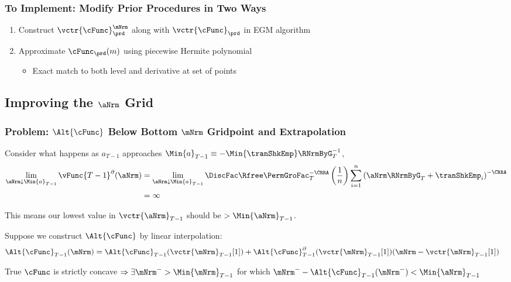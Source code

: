 \documentclass{beamer}
\begin{document}
\begin{frame}
\frametitle{To Implement: Modify Prior Procedures in Two Ways}
\begin{enumerate}
\item Construct $\vctr{\cFunc}^{\mNrm}_{\prd}$ along with $\vctr{\cFunc}_{\prd}$ in EGM algorithm
\item Approximate $\cFunc_{\prd}(m)$ using piecewise Hermite polynomial
\begin{itemize}
\item Exact match to both level and derivative at set of points
\end{itemize}
\end{enumerate}
\end{frame}


\subsection{Improving the $\aNrm$ Grid}

\begin{frame}
\frametitle{Problem: $\Alt{\cFunc}$ Below Bottom $\mNrm$ Gridpoint and Extrapolation}

Consider what happens as $a_{T-1}$ approaches $\Min{a}_{T-1}\equiv-\Min{\tranShkEmp}\RNrmByG_{T}^{-1}$,
\begin{equation*}\begin{gathered}\begin{aligned}
        \lim_{{\aNrm} \downarrow \Min{a}_{T-1}} \vFunc{T-1}^{\partial}(\aNrm) 
& =         \lim_{{\aNrm} \downarrow \Min{a}_{T-1}} \DiscFac \Rfree \PermGroFac_{T}^{-\CRRA} \left(\frac{1}{n}\right) \sum_{i=1}^{n} \left(  \aNrm\RNrmByG_{T}+ \tranShkEmp_{i}\right)^{-\CRRA}
\\  & = \infty
\end{aligned}\end{gathered}\end{equation*}

This means our lowest value in $\vctr{\aNrm}_{T-1}$ should be $> \Min{\aNrm}_{T-1}$.  

\medskip
Suppose we construct $\Alt{\cFunc}$ by linear interpolation:
\begin{equation*}\begin{gathered}\begin{aligned}
  \Alt{\cFunc}_{T-1}(\mNrm)  & = \Alt{\cFunc}_{T-1}(\vctr{\mNrm}_{T-1}[1])+\Alt{\cFunc}_{T-1}^{\partial}(\vctr{\mNrm}_{T-1}[1])(\mNrm-\vctr{\mNrm}_{T-1}[1]) \label{eq:ExtrapLin}
\end{aligned}\end{gathered}\end{equation*}

True $\cFunc$ is strictly concave 
$\Rightarrow \exists \mNrm^{-} > \Min{\mNrm}_{T-1}$  for which $\mNrm^{-}-\Alt{\cFunc}_{T-1}(\mNrm^{-}) < \Min{\aNrm}_{T-1}$

\end{frame}
\end{document}
